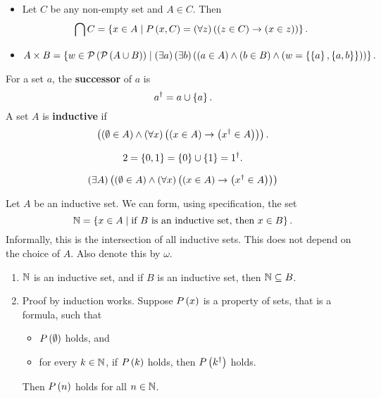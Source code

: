 \begin{example2}
\hfill
\begin{itemize}
\item Let $ C $ be any non-empty set and $ A \in C $. Then
$$ \bigcap C = \left\{ x \in A \mid P\left( x, C \right) = \left( \forall z \right)\left( \left( z \in C \right) \rightarrow \left( x \in z \right) \right) \right\}. $$
\item
$$ A \times B = \left\{ w \in \mathcal{P}\left( \mathcal{P}\left( A \cup B \right) \right) \mid \left( \exists a \right)\left( \exists b \right)\left( \left( a \in A \right) \land \left( b \in B \right) \land \left( w = \left\{ \left\{ a \right\}, \left\{ a, b \right\} \right\} \right) \right) \right\}. $$
\end{itemize}
\end{example2}

\begin{definition}
For a set $ a $, the \textbf{successor} of $ a $ is
$$ a^\dagger = a \cup \left\{ a \right\}. $$
A set $ A $ is \textbf{inductive} if
$$ \left( \left( \emptyset \in A \right) \land \left( \forall x \right)\left( \left( x \in A \right) \rightarrow \left( x^\dagger \in A \right) \right) \right). $$
\end{definition}

\begin{example2}
$$ 2 = \left\{ 0, 1 \right\} = \left\{ 0 \right\} \cup \left\{ 1 \right\} = 1^\dagger. $$
\end{example2}

\begin{axiom}
$$ \left( \exists A \right)\left( \left( \emptyset \in A \right) \land \left( \forall x \right)\left( \left( x \in A \right) \rightarrow \left( x^\dagger \in A \right) \right) \right) $$
\end{axiom}

\begin{definition}
Let $ A $ be an inductive set. We can form, using specification, the set
$$ \mathbb{N} = \left\{ x \in A \mid \text{if} \ B \ \text{is an inductive set, then} \ x \in B \right\}. $$
Informally, this is the intersection of all inductive sets. This does not depend on the choice of $ A $. Also denote this by $ \omega $.
\end{definition}

\begin{theorem}
\label{thm:3.2.3}
\hfill
\begin{enumerate}
\item $ \mathbb{N} $ is an inductive set, and if $ B $ is an inductive set, then $ \mathbb{N} \subseteq B $.
\item Proof by induction works. Suppose $ P\left( x \right) $ is a property of sets, that is a formula, such that
\begin{itemize}
\item $ P\left( \emptyset \right) $ holds, and
\item for every $ k \in \mathbb{N} $, if $ P\left( k \right) $ holds, then $ P\left( k^\dagger \right) $ holds.
\end{itemize}
Then $ P\left( n \right) $ holds for all $ n \in \mathbb{N} $.
\end{enumerate}
\end{theorem}

